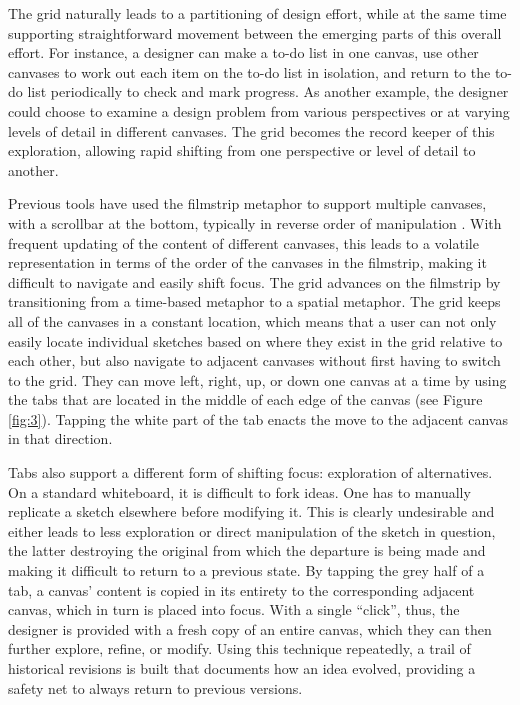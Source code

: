 The grid naturally leads to a partitioning of design effort, while at the same time supporting straightforward movement between the emerging parts of this overall effort. For instance, a designer can make a to-do list in one canvas, use other canvases to work out each item on the to-do list in isolation, and return to the to-do list periodically to check and mark progress. As another example, the designer could choose to examine a design problem from various perspectives or at varying levels of detail in different canvases. The grid becomes the record keeper of this exploration, allowing rapid shifting from one perspective or level of detail to another.

Previous tools have used the filmstrip metaphor to support multiple canvases, with a scrollbar at the bottom, typically in reverse order of manipulation \citep{Stefik}. With frequent updating of the content of different canvases, this leads to a volatile representation in terms of the order of the canvases in the filmstrip, making it difficult to navigate and easily shift focus. The grid advances on the filmstrip by transitioning from a time-based metaphor to a spatial metaphor. The grid keeps all of the canvases in a constant location, which means that a user can not only  easily locate individual sketches based on where they exist in the grid relative to each other, but also navigate to adjacent canvases without first having to switch to the grid. They can move left, right, up, or down one canvas at a time by using the tabs that are located in the middle of each edge of the canvas (see Figure \ref{fig:3}). Tapping the white part of the tab enacts the move to the adjacent canvas in that direction.

Tabs also support a different form of shifting focus: exploration of alternatives. On a standard whiteboard, it is difficult to fork ideas. One has to manually replicate a sketch elsewhere before modifying it. This is clearly undesirable and either leads to less exploration or direct manipulation of the sketch in question, the latter destroying the original from which the departure is being made and making it difficult to return to a previous state. By tapping the grey half of a tab, a canvas' content is copied in its entirety to the corresponding adjacent canvas, which in turn is placed into focus. With a single ``click'', thus, the designer is provided with a fresh copy of an entire canvas, which they can then further explore, refine, or modify. Using this technique repeatedly, a trail of historical revisions is built that documents how an idea evolved, providing a safety net to always return to previous versions.

